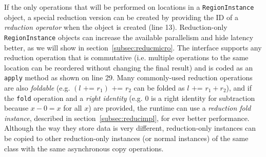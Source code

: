 If the only operations that will be performed on locations in a {\tt RegionInstance} object,
a special reduction version can be created by providing the ID of a {\em reduction operator}
when the object is created (line 13).  Reduction-only {\tt RegionInstance} objects can 
increase the available parallelism and hide latency better, as we will show in 
section~\ref{subsec:reducmicro}.  The interface supports any reduction operation that
is commutative (i.e. multiple operations to the same location can be reordered without 
changing the final result) and is coded as an {\tt apply} method as shown on line 29.
Many commonly-used reduction operations are also {\em foldable} (e.g. $(l \text{ += } r_1) \text{ += } r_2$ can
be folded as $l \text{ += } r_1 + r_2$), and if the {\tt fold} operation and a {\em right identity}
(e.g. $0$ is a right identity for subtraction because $x - 0 = x$ for all $x$) are provided,
the runtime can use a {\em reduction fold instance}, described in section~\ref{subsec:reducimpl},
for ever better performance.  Although the way they store data is very different,
reduction-only instances can be copied to other reduction-only instances (or normal 
instances) of the same class with the same asynchronous copy operations.



